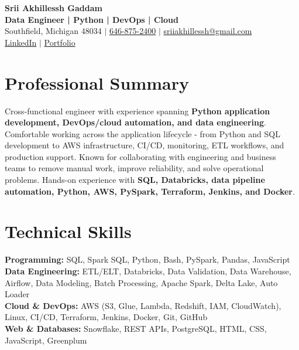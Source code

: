 \documentclass[letterpaper,10pt]{article}
\begin{document}
\fontsize{9.35pt}{10.45pt}\selectfont

\begin{center}
    {\LARGE \textbf{Srii Akhillessh Gaddam}} \\[-1pt]
    \textbf{Data Engineer | Python | DevOps | Cloud} \\[2pt]
    Southfield, Michigan 48034 $|$
    \href{tel:6468752400}{646-875-2400} $|$
    \href{mailto:sriiakhillessh@gmail.com}{sriiakhillessh@gmail.com} \\[1pt]
    \href{https://www.linkedin.com/in/srii-akhiilessh-gaddam-b48668191/}{LinkedIn} $|$
    \href{https://sriiakhillesshg.github.io/portfolio/}{Portfolio}
\end{center}
\vspace{-8pt}

\section{Professional Summary}
\small{Cross-functional engineer with experience spanning \textbf{Python application development, DevOps/cloud automation, and data engineering}. Comfortable working across the application lifecycle - from Python and SQL development to AWS infrastructure, CI/CD, monitoring, ETL workflows, and production support. Known for collaborating with engineering and business teams to remove manual work, improve reliability, and solve operational problems. Hands-on experience with \textbf{SQL, Databricks, data pipeline automation, Python, AWS, PySpark, Terraform, Jenkins, and Docker}.}

\section{Technical Skills}
\small{
\textbf{Programming:} SQL, Spark SQL, Python, Bash, PySpark, Pandas, JavaScript \\
\textbf{Data Engineering:} ETL/ELT, Databricks, Data Validation, Data Warehouse, Airflow, Data Modeling, Batch Processing, Apache Spark, Delta Lake, Auto Loader \\
\textbf{Cloud \& DevOps:} AWS (S3, Glue, Lambda, Redshift, IAM, CloudWatch), Linux, CI/CD, Terraform, Jenkins, Docker, Git, GitHub \\
\textbf{Web \& Databases:} Snowflake, REST APIs, PostgreSQL, HTML, CSS, JavaScript, Greenplum
}
\end{document}
